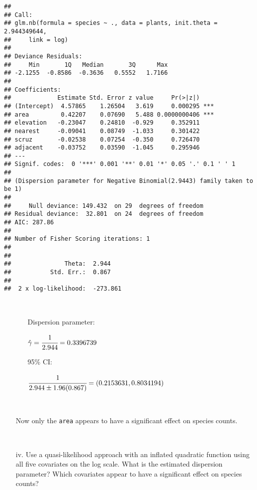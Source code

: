 \documentclass[]{article}
\begin{document}
\begin{verbatim}
## 
## Call:
## glm.nb(formula = species ~ ., data = plants, init.theta = 2.944349644, 
##     link = log)
## 
## Deviance Residuals: 
##     Min       1Q   Median       3Q      Max  
## -2.1255  -0.8586  -0.3636   0.5552   1.7166  
## 
## Coefficients:
##             Estimate Std. Error z value     Pr(>|z|)    
## (Intercept)  4.57865    1.26504   3.619     0.000295 ***
## area         0.42207    0.07690   5.488 0.0000000406 ***
## elevation   -0.23047    0.24810  -0.929     0.352911    
## nearest     -0.09041    0.08749  -1.033     0.301422    
## scruz       -0.02538    0.07254  -0.350     0.726470    
## adjacent    -0.03752    0.03590  -1.045     0.295946    
## ---
## Signif. codes:  0 '***' 0.001 '**' 0.01 '*' 0.05 '.' 0.1 ' ' 1
## 
## (Dispersion parameter for Negative Binomial(2.9443) family taken to be 1)
## 
##     Null deviance: 149.432  on 29  degrees of freedom
## Residual deviance:  32.801  on 24  degrees of freedom
## AIC: 287.86
## 
## Number of Fisher Scoring iterations: 1
## 
## 
##               Theta:  2.944 
##           Std. Err.:  0.867 
## 
##  2 x log-likelihood:  -273.861
\end{verbatim}

~

\begin{itemize}\item[]\begin{itemize}
\item[]
 Dispersion parameter: 
 
 \hfil $\hat{\gamma} = \cfrac{1}{2.944} =  0.3396739$

 
95\% CI: 

 \hfil $\cfrac{1}{2.944 \pm 1.96(0.867)} =  (0.2153631, 0.8034194)$

\end{itemize}

\ 

Now only the {\tt area} appears to have a significant effect on species counts.
\end{itemize}

~

\begin{itemize}
\item[iv.] Use a quasi-likelihood approach with an inflated quadratic function using all five covariates on the log scale. What is the estimated dispersion parameter?  Which covariates appear to have a significant effect on species counts?
\end{itemize}
\end{document}
